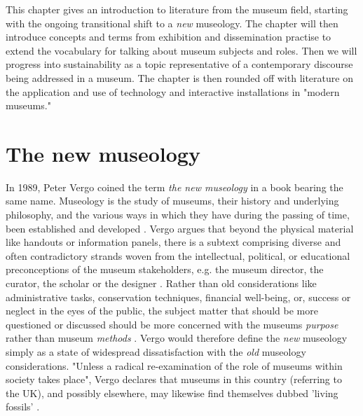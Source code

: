 This chapter gives an introduction to literature from the museum field, starting with the ongoing transitional shift to a \emph{new} museology. The chapter will then introduce concepts and terms from exhibition and dissemination practise to extend the vocabulary for talking about museum subjects and roles. Then we will progress into sustainability as a topic representative of a contemporary discourse being addressed in a museum. The chapter is then rounded off with literature on the application and use of technology and interactive installations in "modern museums."

\section{The new museology}
In 1989, Peter Vergo coined the term \emph{the new museology} in a book bearing the same name. Museology is the study of museums, their history and underlying philosophy, and the various ways in which they have during the passing of time, been established and developed \autocite[p.1]{vergo_museology_1989}. Vergo argues that beyond the physical material like handouts or information panels, there is a subtext comprising diverse and often contradictory strands woven from the intellectual, political, or educational preconceptions of the museum stakeholders, e.g. the museum director, the curator, the scholar or the designer \autocite[p.3]{vergo_museology_1989}. Rather than old considerations like administrative tasks, conservation techniques, financial well-being, or, success or neglect in the eyes of the public, the subject matter that should be more questioned or discussed should be more concerned with the museums \emph{purpose} rather than museum \emph{methods} \autocite[p.3]{vergo_museology_1989}. Vergo would therefore define the \emph{new} museology simply as a state of widespread dissatisfaction with the \emph{old} museology considerations. "Unless a radical re-examination of the role of museums within society takes place", Vergo declares that museums in this country (referring to the UK), and possibly elsewhere, may likewise find themselves dubbed 'living fossils' \autocite[p.4]{vergo_museology_1989}.

